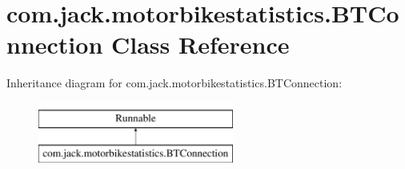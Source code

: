 \hypertarget{classcom_1_1jack_1_1motorbikestatistics_1_1_b_t_connection}{}\section{com.\+jack.\+motorbikestatistics.\+B\+T\+Connection Class Reference}
\label{classcom_1_1jack_1_1motorbikestatistics_1_1_b_t_connection}
Inheritance diagram for com.\+jack.\+motorbikestatistics.\+B\+T\+Connection\+:\begin{figure}[H]
\begin{center}
\leavevmode
\includegraphics[height=2.000000cm]{classcom_1_1jack_1_1motorbikestatistics_1_1_b_t_connection}
\end{center}
\end{figure}
